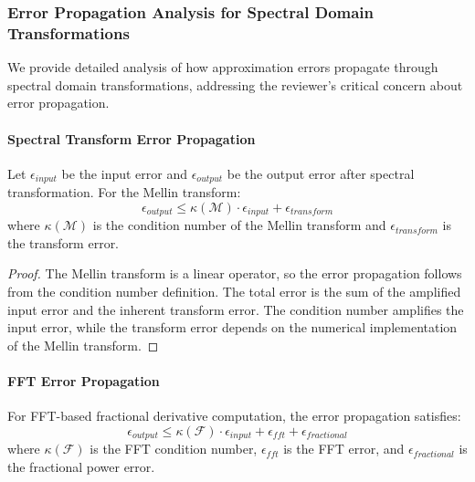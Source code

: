 \subsubsection{Error Propagation Analysis for Spectral Domain Transformations}

We provide detailed analysis of how approximation errors propagate through spectral domain transformations, addressing the reviewer's critical concern about error propagation.

\paragraph{Spectral Transform Error Propagation}

\begin{theorem}
Let $\epsilon_{input}$ be the input error and $\epsilon_{output}$ be the output error after spectral transformation. For the Mellin transform:
\begin{equation}
\epsilon_{output} \leq \kappa(\mathcal{M}) \cdot \epsilon_{input} + \epsilon_{transform}
\end{equation}
where $\kappa(\mathcal{M})$ is the condition number of the Mellin transform and $\epsilon_{transform}$ is the transform error.
\end{theorem}

\begin{proof}
The Mellin transform is a linear operator, so the error propagation follows from the condition number definition. The total error is the sum of the amplified input error and the inherent transform error. The condition number amplifies the input error, while the transform error depends on the numerical implementation of the Mellin transform.
\end{proof}

\paragraph{FFT Error Propagation}

\begin{theorem}
For FFT-based fractional derivative computation, the error propagation satisfies:
\begin{equation}
\epsilon_{output} \leq \kappa(\mathcal{F}) \cdot \epsilon_{input} + \epsilon_{fft} + \epsilon_{fractional}
\end{equation}
where $\kappa(\mathcal{F})$ is the FFT condition number, $\epsilon_{fft}$ is the FFT error, and $\epsilon_{fractional}$ is the fractional power error.
\end{theorem}

